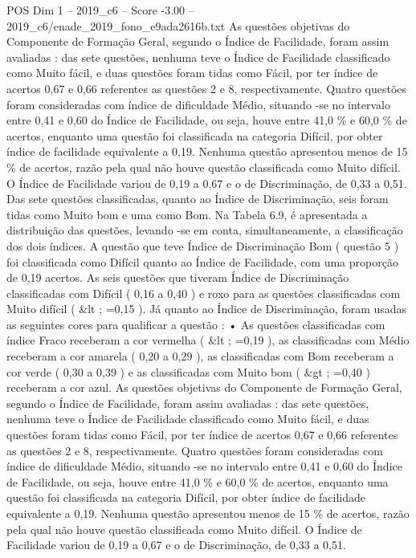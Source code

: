 \begin{textsample}{POS Dim 1 – 2019\_c6 – Score -3.00 – 2019\_c6/enade\_2019\_fono\_e9ada2616b.txt}
As questões objetivas do Componente de Formação Geral, segundo o Índice de Facilidade, foram assim avaliadas : das sete questões, nenhuma teve o Índice de Facilidade classificado como Muito fácil, e duas questões foram tidas como Fácil, por ter índice de acertos 0,67 e 0,66 referentes as questões 2 e 8, respectivamente.
Quatro questões foram consideradas com índice de dificuldade Médio, situando -se no intervalo entre 0,41 e 0,60 do Índice de Facilidade, ou seja, houve entre 41,0 \% e 60,0 \% de acertos, enquanto uma questão foi classificada na categoria Difícil, por obter índice de facilidade equivalente a 0,19.
Nenhuma questão apresentou menos de 15 \% de acertos, razão pela qual não houve questão classificada como Muito difícil.
O Índice de Facilidade variou de 0,19 a 0,67 e o de Discriminação, de 0,33 a 0,51.
Das sete questões classificadas, quanto ao Índice de Discriminação, seis foram tidas como Muito bom e uma como Bom.
Na Tabela 6.9, é apresentada a distribuição das questões, levando -se em conta, simultaneamente, a classificação dos dois índices.
A questão que teve Índice de Discriminação Bom ( questão 5 ) foi classificada como Difícil quanto ao Índice de Facilidade, com uma proporção de 0,19 acertos.
As seis questões que tiveram Índice de Discriminação classificadas com Difícil ( 0,16 a 0,40 ) e roxo para as questões classificadas com Muito difícil ( \&lt ; =0,15 ).
Já quanto ao Índice de Discriminação, foram usadas as seguintes cores para qualificar a questão : • As questões classificadas com índice Fraco receberam a cor vermelha ( \&lt ; =0,19 ), as classificadas com Médio receberam a cor amarela ( 0,20 a 0,29 ), as classificadas com Bom receberam a cor verde ( 0,30 a 0,39 ) e as classificadas com Muito bom ( \&gt ; =0,40 ) receberam a cor azul.
As questões objetivas do Componente de Formação Geral, segundo o Índice de Facilidade, foram assim avaliadas : das sete questões, nenhuma teve o Índice de Facilidade classificado como Muito fácil, e duas questões foram tidas como Fácil, por ter índice de acertos 0,67 e 0,66 referentes as questões 2 e 8, respectivamente.
Quatro questões foram consideradas com índice de dificuldade Médio, situando -se no intervalo entre 0,41 e 0,60 do Índice de Facilidade, ou seja, houve entre 41,0 \% e 60,0 \% de acertos, enquanto uma questão foi classificada na categoria Difícil, por obter índice de facilidade equivalente a 0,19.
Nenhuma questão apresentou menos de 15 \% de acertos, razão pela qual não houve questão classificada como Muito difícil.
O Índice de Facilidade variou de 0,19 a 0,67 e o de Discriminação, de 0,33 a 0,51.

\end{textsample}
